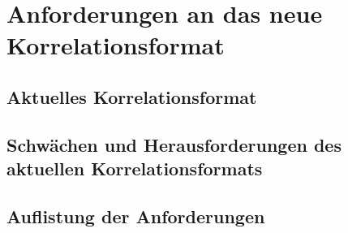 \chapter{Anforderungen an das neue Korrelationsformat}


\section{Aktuelles Korrelationsformat}


\section{Schwächen und Herausforderungen des aktuellen Korrelationsformats}


\section{Auflistung der Anforderungen}
